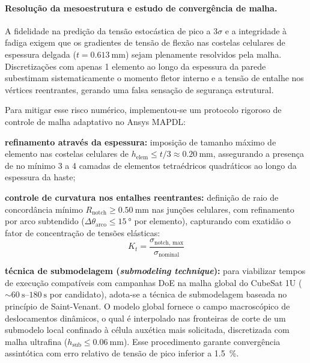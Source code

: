 \paragraph*{Resolução da mesoestrutura e estudo de convergência de malha.}
A fidelidade na predição da tensão estocástica de pico a $3\sigma$ e a integridade à fadiga exigem que os gradientes de tensão de flexão nas costelas celulares de espessura delgada ($t = \SI{0.613}{\milli\metre}$) sejam plenamente resolvidos pela malha. Discretizações com apenas 1 elemento ao longo da espessura da parede subestimam sistematicamente o momento fletor interno e a tensão de entalhe nos vértices reentrantes, gerando uma falsa sensação de segurança estrutural.

Para mitigar esse risco numérico, implementou-se um protocolo rigoroso de controle de malha adaptativo no Ansys MAPDL:
\begin{alineas}
  \item \textbf{refinamento através da espessura:} imposição de tamanho máximo de elemento nas costelas celulares de $h_{\text{elem}} \le t / 3 \approx \SI{0.20}{\milli\metre}$, assegurando a presença de no mínimo 3 a 4 camadas de elementos tetraédricos quadráticos ao longo da espessura da haste;
  \item \textbf{controle de curvatura nos entalhes reentrantes:} definição de raio de concordância mínimo $R_{\text{notch}} \ge \SI{0.50}{\milli\metre}$ nas junções celulares, com refinamento por arco subtendido ($\Delta \theta_{\text{arco}} \le \SI{15}{\degree}$ por elemento), capturando com exatidão o fator de concentração de tensões elásticas:
  \begin{equation}
    K_t = \frac{\sigma_{\text{notch, max}}}{\sigma_{\text{nominal}}}
    \label{eq:kt}
  \end{equation}
  \item \textbf{técnica de submodelagem (\textit{submodeling technique}):} para viabilizar tempos de execução compatíveis com campanhas DoE na malha global do CubeSat 1U ($\sim \SIrange{60}{180}{\second}$ por candidato), adota-se a técnica de submodelagem baseada no princípio de Saint-Venant. O modelo global fornece o campo macroscópico de deslocamentos dinâmicos, o qual é interpolado nas fronteiras de corte de um submodelo local confinado à célula auxética mais solicitada, discretizada com malha ultrafina ($h_{\text{sub}} \le \SI{0.06}{\milli\metre}$). Esse procedimento garante convergência assintótica com erro relativo de tensão de pico inferior a \SI{1.5}{\percent}.
\end{alineas}

